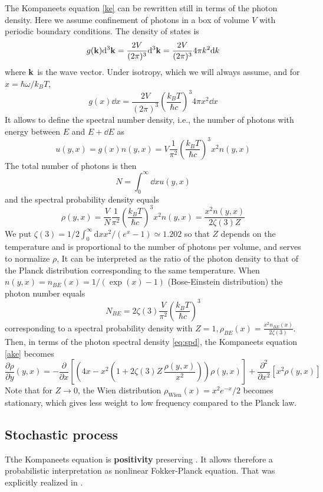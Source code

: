 \documentclass[a4paper,12pt,reqno,superscriptaddress,nofootinbib]{article}
\theoremstyle{plain}
\theoremstyle{definition}
\theoremstyle{remark}
\newcommand{\id}{\textrm{d}}
\newcommand{\0}{^{(0)}}
\newcommand{\1}{^{(1)}}
\newcommand{\2}{^{(2)}}
\begin{document}
The Kompaneets equation \eqref{ke} can be rewritten still in terms of the photon density.  Here we assume confinement of photons in a box of volume $V$ with periodic boundary conditions.  The density of states is
\[
g(\vb{k}) \dd^3 \vb{k} = \frac{2V}{(2\pi)^3} \dd^3 \vb{k} = \frac{2V}{(2\pi)^3} 
4\pi k^2 \dd k
\]
where $\vb{k}$ is the wave vector.  Under isotropy, which we will always assume, and for $x = \hbar \omega / k_B T$,
\[
g(x) \dd x = \frac{2V}{(2\pi)^3} \left( \frac{k_B T}{\hbar c} \right)^3 4\pi 
x^2 \dd x
\] 
It allows to define the spectral number density, i.e., the number of photons with energy between $E$ and $E+\dd E$ as 
\begin{equation}\label{eq:snd}
u(y,x) = g(x) n(y,x) = V \frac{1}{\pi^2} \left( \frac{k_B T}{\hbar c} \right)^3 
x^2 n(y,x)
\end{equation}
The total number of photons is then
\[ N = \int_0^\infty \dd{x} u(y,x)
 \]
and the spectral probability density equals
\begin{equation}\label{eq:spd}
\rho(y,x) = \frac{V}{N} \frac{1}{\pi^2} \left(\frac{k_B T}{\hbar c}\right)^3 
x^2 n(y,x) = \frac{x^2 n(y,x)}{2\zeta(3) Z}
\end{equation}
We put $\zeta(3) = 1/2 \int_0^\infty \id x x^2/(e^x-1) \simeq 1.202$
so that $Z$ depends on the temperature and is proportional 
to the number of photons per volume, and serves to normalize $\rho$,  It can be interpreted as the ratio of the photon density to that 
of the Planck distribution corresponding to the same temperature.
 When $n(y,x)= n_{BE}(x) = 1 / (\exp(x) - 1)$ (Bose-Einstein distribution) the photon number 
equals
\[
N_{BE} = 2 \zeta(3) \frac{V}{\pi^2} \left( \frac{k_B T}{\hbar c} \right)^3
\]
corresponding to a spectral probability density with $Z = 1, \rho_{BE}(x) = \frac{x^2 n_{BE}(x)}{2\zeta(3)}$.\\
Then,  in terms of the photon spectral density \eqref{eq:spd}, the Kompaneets equation \eqref{ake} becomes
\begin{equation}\label{kp}
\frac{\partial \rho}{\partial y} (y,x) = -\frac{\partial}{\partial x}\left[\left(4x- x^2\left(1+2\zeta(3) Z\,\frac{\rho(y,x)}{x^2}\right)\right)\rho(y,x)\right] + \frac{\partial^2}{\partial x^2}\left[x^2 \rho(y,x)\right]
\end{equation}
Note that for 
$Z\rightarrow 0$, the Wien distribution $\rho_\text{Wien}(x) = x^2 e^{-x}/2$ becomes stationary, which gives less weight to low frequency compared to the Planck law.

\subsection{Stochastic process}
Tthe Kompaneets equation is \textbf{positivity} preserving \cite{positivity}. It allows therefore a probabilistic interpretation as nonlinear Fokker-Planck equation.  That was explicitly realized in \cite{fre}.\\
\end{document}
